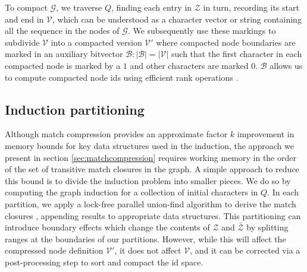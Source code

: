 \documentclass{bioinfo}
\theoremstyle{definition}
\newcommand{\red}[1]{{\textcolor{Red}{#1}}}
\newcommand{\FIXME}[1]{\red{[FIXME: #1]}}
\begin{document}
To compact $\mathcal{G}$, we traverse $Q$, finding each entry in $\mathcal{Z}$ in turn, recording its start and end in $\mathcal{V}$, which can be understood as a character vector or string containing all the sequence in the nodes of $\mathcal{G}$.
We subsequently use these markings to subdivide $\mathcal{V}$ into a compacted version $\mathcal{V}'$ where compacted node boundaries are marked in an auxiliary bitvector $\mathcal{B} : |\mathcal{B}| = |\mathcal{V}|$ such that the first character in each compacted node is marked by a $1$ and other characters are marked $0$.
$\mathcal{B}$ allows us to compute compacted node ids using efficient rank operations \citep{Gog_2014}.


\subsection{Induction partitioning}
\label{sec:partitioning}

Although match compression provides an approximate factor $k$ improvement in memory bounds for key data structures used in the induction, the approach we present in section \ref{sec:matchcompression} requires working memory in the order of the set of transitive match closures in the graph.
A simple approach to reduce this bound is to divide the induction problem into smaller pieces.
We do so by computing the graph induction for a collection of initial characters in $Q$.
In each partition, we apply a lock-free parallel union-find algorithm to derive the match closures \citep{anderson1991wait}, appending results to appropriate data structures.
This partitioning can introduce boundary effects which change the contents of $\mathcal{Z}$ and $\bar{\mathcal{Z}}$ by splitting ranges at the boundaries of our partitions.
However, while this will affect the compressed node definition $\mathcal{V}'$, it does not affect $\mathcal{V}$, and it can be corrected via a post-processing step to sort and compact the id space.
\end{document}
